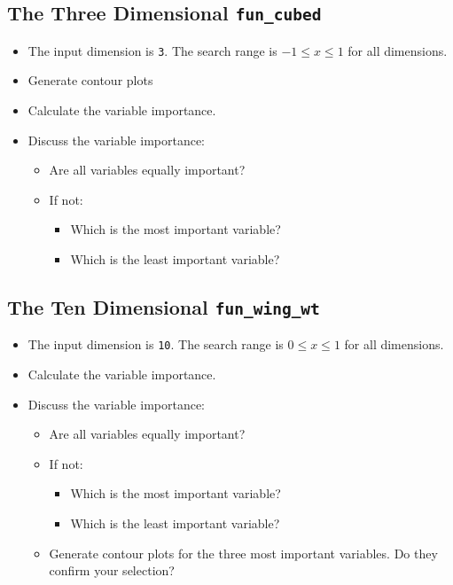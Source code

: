 \documentclass[
  letterpaper,
  DIV=11,
  numbers=noendperiod]{scrreprt}
\providecommand{\tightlist}{%
  \setlength{\itemsep}{0pt}\setlength{\parskip}{0pt}}\usepackage{longtable,booktabs,array}
\begin{document}
\subsection{\texorpdfstring{The Three Dimensional
\texttt{fun\_cubed}}{The Three Dimensional fun\_cubed}}\label{the-three-dimensional-fun_cubed}

\begin{itemize}
\tightlist
\item
  The input dimension is \texttt{3}. The search range is
  \(-1 \leq x \leq 1\) for all dimensions.
\item
  Generate contour plots
\item
  Calculate the variable importance.
\item
  Discuss the variable importance:

  \begin{itemize}
  \tightlist
  \item
    Are all variables equally important?
  \item
    If not:

    \begin{itemize}
    \tightlist
    \item
      Which is the most important variable?
    \item
      Which is the least important variable?
    \end{itemize}
  \end{itemize}
\end{itemize}

\subsection{\texorpdfstring{The Ten Dimensional
\texttt{fun\_wing\_wt}}{The Ten Dimensional fun\_wing\_wt}}\label{the-ten-dimensional-fun_wing_wt}

\begin{itemize}
\tightlist
\item
  The input dimension is \texttt{10}. The search range is
  \(0 \leq x \leq 1\) for all dimensions.
\item
  Calculate the variable importance.
\item
  Discuss the variable importance:

  \begin{itemize}
  \tightlist
  \item
    Are all variables equally important?
  \item
    If not:

    \begin{itemize}
    \tightlist
    \item
      Which is the most important variable?
    \item
      Which is the least important variable?
    \end{itemize}
  \item
    Generate contour plots for the three most important variables. Do
    they confirm your selection?
  \end{itemize}
\end{itemize}
\end{document}

